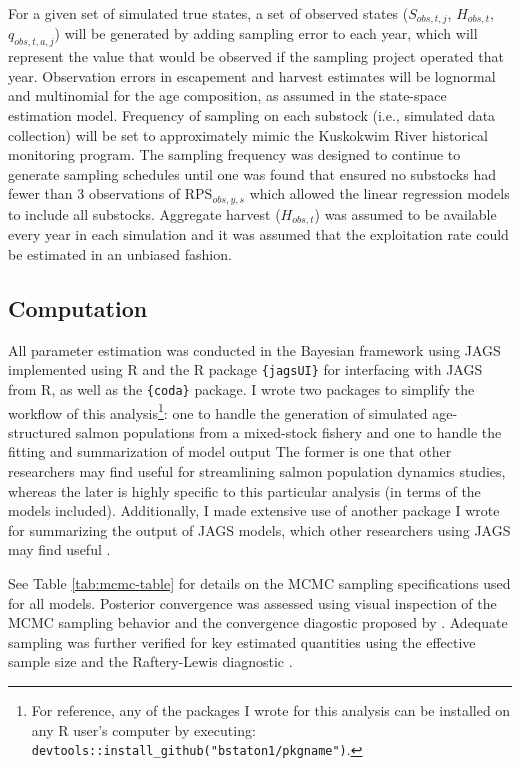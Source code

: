 \documentclass[12pt,]{book}
\let\rmarkdownfootnote\footnote%
\def\footnote{\protect\rmarkdownfootnote}
\theoremstyle{definition}
\theoremstyle{definition}
\theoremstyle{definition}
\theoremstyle{remark}
\begin{document}
For a given set of simulated true states, a set of observed states
(\(S_{obs,t,j}\), \(H_{obs,t}\), \(q_{obs,t,a,j}\)) will be generated by
adding sampling error to each year, which will represent the value that
would be observed if the sampling project operated that year.
Observation errors in escapement and harvest estimates will be lognormal
and multinomial for the age composition, as assumed in the state-space
estimation model. Frequency of sampling on each substock (i.e.,
simulated data collection) will be set to approximately mimic the
Kuskokwim River historical monitoring program. The sampling frequency
was designed to continue to generate sampling schedules until one was
found that ensured no substocks had fewer than 3 observations of
\(\text{RPS}_{obs,y,s}\) which allowed the linear regression models to
include all substocks. Aggregate harvest (\(H_{obs,t}\)) was assumed to
be available every year in each simulation and it was assumed that the
exploitation rate could be estimated in an unbiased fashion.

\subsection{Computation}\label{computation}

\noindent
All parameter estimation was conducted in the Bayesian framework using
JAGS \citep{plummer-2017} implemented using R \citep{r-cite} and the R
package \texttt{\{jagsUI\}} \citep{r-jagsUI} for interfacing with JAGS
from R, as well as the \texttt{\{coda\}} \citep{r-coda} package. I wrote
two packages to simplify the workflow of this analysis\footnote{For
  reference, any of the packages I wrote for this analysis can be
  installed on any R user's computer by executing:
  \texttt{devtools::install\_github("bstaton1/pkgname")}.}: one to
handle the generation of simulated age-structured salmon populations
from a mixed-stock fishery \citep[\texttt{\{SimSR\}};][]{r-SimSR} and
one to handle the fitting and summarization of model output
\citep[\texttt{\{FitSR\}};][]{r-FitSR} The former is one that other
researchers may find useful for streamlining salmon population dynamics
studies, whereas the later is highly specific to this particular
analysis (in terms of the models included). Additionally, I made
extensive use of another package I wrote for summarizing the output of
JAGS models, which other researchers using JAGS may find useful
\citep[\texttt{\{codaTools\}};][]{r-codaTools}.

See Table \ref{tab:mcmc-table} for details on the MCMC sampling
specifications used for all models. Posterior convergence was assessed
using visual inspection of the MCMC sampling behavior and the
convergence diagostic proposed by \citet{brooks-gelman-1998}. Adequate
sampling was further verified for key estimated quantities using the
effective sample size and the Raftery-Lewis diagnostic
\citep{raftery-lewis-1992}.
\end{document}
